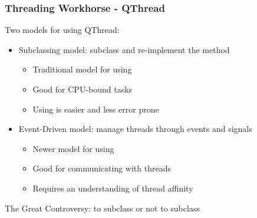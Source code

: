 
\begin{slide}
\frametitle{Threading Workhorse - QThread}

Two models for using QThread:
\begin{itemize}
\item Subclassing model: subclass and re-implement the  method
  \begin{itemize}
  \item Traditional model for using 
  \item Good for CPU-bound tasks
  \item Using  is easier and less error prone
  \end{itemize}
\item Event-Driven model: manage threads through events and signals
  \begin{itemize}
  \item Newer model for using 
  \item Good for communicating with threads
  \item Requires an understanding of thread affinity
  \end{itemize}
\end{itemize}

\vspace{1em}
The Great  Controversy: to subclass or not to subclass \\

\end{slide}



